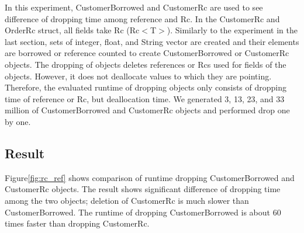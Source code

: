 

In this experiment, CustomerBorrowed and CustomerRc are used to see difference of dropping time among reference and Rc. 
In the CustomerRc and OrderRc struct, all fields take Rc (Rc$<$T$>$). Similarly to the experiment in the last section, 
sets of integer, float, and String vector are created and their elements are borrowed or reference counted to create CustomerBorrowed or CustomerRc objects.
The dropping of objects deletes references or Rcs used for fields of the objects. However, it does not deallocate values to which they are pointing. 
Therefore, the evaluated runtime of dropping objects only consists of dropping time of reference or Rc, but deallocation time.
We generated 3, 13, 23, and 33 million of CustomerBorrowed and CustomerRc objects and performed drop one by one. 

\subsection{Result}
Figure\ref{fig:rc_ref} shows comparison of runtime dropping CustomerBorrowed and CustomerRc objects. 
The result shows significant difference of dropping time among the two objects; deletion of CustomerRc is much slower than CustomerBorrowed. 
The runtime of dropping CustomerBorrowed is about 60 times faster than dropping CustomerRc. 

